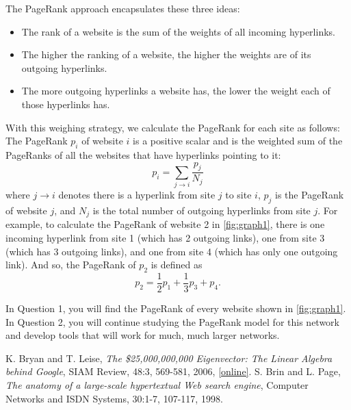 \documentclass[10pt,answers]{exam}
\begin{document}
The PageRank approach encapsulates these three ideas:
\begin{itemize}
\item The rank of a website is the sum of the weights of all incoming
  hyperlinks.
\item The higher the ranking of a website, the higher the weights are of its
  outgoing hyperlinks.
\item The more outgoing hyperlinks a website has, the lower the weight each of
  those hyperlinks has.
\end{itemize}
With this weighing strategy, we calculate the PageRank for each site as follows:
The PageRank $p_i$ of website $i$ is a positive scalar and is the weighted sum
of the PageRanks of all the websites that have hyperlinks pointing to it:
\begin{equation}
  \label{eq:1}
  p_i = \sum_{j\rightarrow i} \frac{p_j}{N_j}
\end{equation}
where $j \rightarrow i$ denotes there is a hyperlink from site $j$ to site $i$,
$p_j$ is the PageRank of website $j$, and $N_j$ is the total number of outgoing
hyperlinks from site $j$.  For example, to calculate the PageRank of website 2
in \cref{fig:graph1}, there is one incoming hyperlink from site 1 (which has 2
outgoing links), one from site 3 (which has 3 outgoing links), and one from site
4 (which has only one outgoing link). And so, the PageRank of $p_2$ is defined
as
\begin{equation}
  \label{eq:2}
  p_2 = \frac{1}{2} p_1 + \frac{1}{3} p_3 + p_4.
\end{equation}

In Question 1, you will find the PageRank of every website shown in
\cref{fig:graph1}.  In Question 2, you will continue studying the PageRank model
for this network and develop tools that will work for much, much larger
networks.

\vspace{.2cm}


\begin{thebibliography}{3}
 K. Bryan and T. Leise, \textit{The \$25,000,000,000
    Eigenvector: The Linear Algebra behind Google}, SIAM Review, 48:3, 569-581,
  2006,
  \href{https://q.utoronto.ca/courses/375036/modules/items/6183944}{[online]}.
 S. Brin and L. Page, \textit{The anatomy of a large-scale
    hypertextual Web search engine}, Computer Networks and ISDN Systems, 30:1-7,
  107-117, 1998.
\end{thebibliography}
\end{document}
